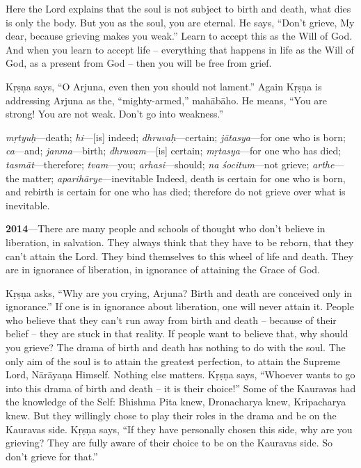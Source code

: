 Here the Lord explains that the soul is not subject to birth and death, what dies is only the body. But you as the soul, you are eternal. He says, “Don’t grieve, My dear, because grieving makes you weak.” Learn to accept this as the Will of God. And when you learn to accept life – everything that happens in life as the Will of God, as a present from God – then you will be free from grief.

Kṛṣṇa says, “O Arjuna, even then you should not lament.” Again Kṛṣṇa is addressing Arjuna as the, “mighty-armed,” mahābāho. He means, “You are strong! You are not weak. Don’t go into weakness.”

{%
  \textit{mṛtyuḥ}---death; 
  \textit{hi}---[is] indeed; 
  \textit{dhruvaḥ}---certain; 
  \textit{jātasya}---for one who is born; 
  \textit{ca}---and; 
  \textit{janma}---birth; 
  \textit{dhruvam}---[is] certain; 
  \textit{mṛtasya}---for one who has died; 
  \textit{tasmāt}---therefore; 
  \textit{tvam}---you; 
  \textit{arhasi}---should; 
  \textit{na śocitum}---not grieve; 
  \textit{arthe}---the matter; 
  \textit{aparihārye}---inevitable
}
{%
  Indeed, death is certain for one who is born, and rebirth is certain for one who has died; therefore do not grieve over what is inevitable.
}

\textbf{2014}---There are many people and schools of thought who don’t believe in liberation, in salvation. They always think that they have to be reborn, that they can’t attain the Lord. They bind themselves to this wheel of life and death. They are in ignorance of liberation, in ignorance of attaining the Grace of God.

Kṛṣṇa asks, “Why are you crying, Arjuna? Birth and death are conceived only in ignorance.” If one is in ignorance about liberation, one will never attain it. People who believe that they can’t run away from birth and death – because of their belief – they are stuck in that reality. If people want to believe that, why should you grieve? The drama of birth and death has nothing to do with the soul. The only aim of the soul is to attain the greatest perfection, to attain the Supreme Lord, Nārāyaṇa Himself. Nothing else matters. Kṛṣṇa says, “Whoever wants to go into this drama of birth and death – it is their choice!” Some of the Kauravas had the knowledge of the Self: Bhishma Pita knew, Dronacharya knew, Kripacharya knew. But they willingly chose to play their roles in the drama and be on the Kauravas side. Kṛṣṇa says, “If they have personally chosen this side, why are you grieving? They are fully aware of their choice to be on the Kauravas side. So don’t grieve for that.”

